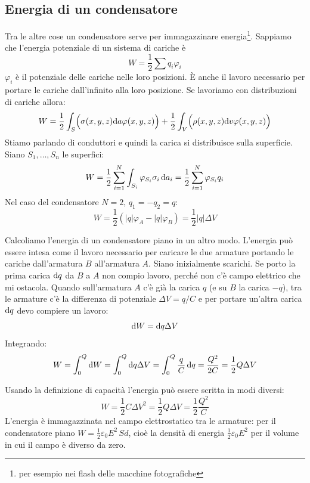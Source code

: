 \subsection{Energia di un condensatore}
Tra le altre cose un condensatore serve per immagazzinare energia\footnote{per esempio nei flash delle macchine fotografiche}. Sappiamo che l'energia potenziale di un sistema di cariche è
\[W=\frac{1}{2}\sum q_i\varphi_i\]
$\varphi_i$ è il potenziale delle cariche nelle loro posizioni. \`E anche il lavoro necessario per portare le cariche dall'infinito alla loro posizione. Se lavoriamo con distribuzioni di cariche allora:
\[W=\frac{1}{2}\int_S\Bigl(\sigma(x,y,z)\mathrm{d} a\varphi(x,y,z)\Bigr)+\frac{1}{2}\int_V\Bigl(\rho(x,y,z)\mathrm{d} v\varphi(x,y,z)\Bigr)\]
Stiamo parlando di conduttori e quindi la carica si distribuisce sulla superficie. Siano $S_1,\ldots,S_n$ le superfici:
\[W=\frac{1}{2}\sum_{i=1}^N\int_{S_i}\varphi_{S_i}\sigma_i\,\mathrm{d} a_i=\frac{1}{2}\sum_{i=1}^N\varphi_{S_i}q_{i}\]
Nel caso del condensatore $N=2$, $q_1=-q_2=q$:
\[W=\frac{1}{2}\left(|q|\varphi_A-|q|\varphi_B\right)=\frac{1}{2}|q|\Delta V\]

\begin{Es}
  Calcoliamo l'energia di un condensatore piano in un altro modo. L'energia può essere intesa come il lavoro necessario per caricare le due armature portando le cariche dall'armatura $B$ all'armatura $A$. Siano inizialmente scarichi. Se porto la prima carica $\mathrm{d} q$ da $B$ a $A$ non compio lavoro, perché non c'è campo elettrico che mi ostacola. Quando sull'armatura $A$ c'è già la carica $q$ (e su $B$ la carica $-q$), tra le armature c'è la differenza di potenziale $\Delta V=q/C$ e per portare un'altra carica $\mathrm{d} q$ devo compiere un lavoro:
  \[\mathrm{d} W=\mathrm{d} q\Delta V\]
  Integrando:
  \[W=\int_0^Q\mathrm{d} W=\int_0^Q\mathrm{d} q\Delta V=\int_0^Q\frac{q}{C}\,\mathrm{d} q=\frac{Q^2}{2C}=\frac{1}{2}Q\Delta V\]
\end{Es}

Usando la definizione di capacità l'energia può essere scritta in modi diversi:
\begin{equation}
  W=\frac{1}{2}C\Delta V^2=\frac{1}{2}Q\Delta V=\frac{1}{2}\frac{Q^2}{C}
\end{equation}
L'energia è immagazzinata nel campo elettrostatico tra le armature: per il condensatore piano $W=\frac{1}{2}\varepsilon_0E^2\,Sd$, cioè la densità di energia $\frac{1}{2}\varepsilon_0E^2$ per il volume in cui il campo è diverso da zero.


